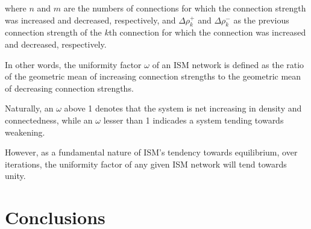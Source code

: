 \documentclass[12pt]{article}
\begin{document}
where $n$ and $m$ are the numbers of connections for which the connection strength was increased and decreased, respectively, and $\Delta \rho^+_k$ and $\Delta \rho^-_k$ as the previous connection strength of the $k$th connection for which the connection was increased and decreased, respectively.

In other words, the uniformity factor $\omega$ of an ISM network is defined as the ratio of the geometric mean of increasing connection strengths to the geometric mean of decreasing connection strengths. 

Naturally, an $\omega$ above 1 denotes that the system is net increasing in density and connectedness, while an $\omega$ lesser than 1 indicades a system tending towards weakening. 

However, as a fundamental nature of ISM's tendency towards equilibrium, over iterations, the uniformity factor of any given ISM network will tend towards unity.

\section{Conclusions}
\end{document}
